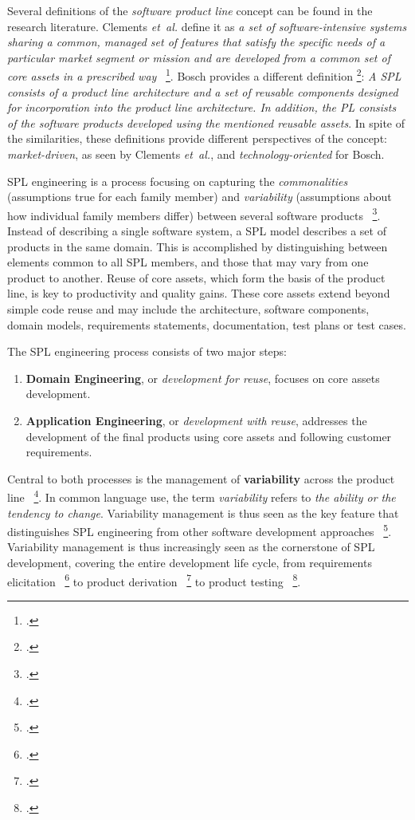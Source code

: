 Several definitions of the \emph{software product line} concept can be found
in the research literature. Clements \textit{et~al.} define it as \textit{a set of
software-intensive systems sharing a common, managed set of features that
satisfy the specific needs of a particular market segment or mission and are
developed from a common set of core assets in a prescribed way}~
   \footcite{Northrop2002}. Bosch provides a different definition    \footcite{Bosch2000}:
\textit{A SPL consists of a product line architecture and a set of reusable
components designed for incorporation into the product line architecture. In
addition, the PL consists of the software products developed using the
mentioned reusable assets}. In spite of the similarities, these definitions
provide different perspectives of the concept: \textit{market-driven}, as seen
by Clements \textit{et~al.}, and \textit{technology-oriented} for Bosch.

SPL engineering is a process focusing on capturing the \textit{commonalities}
(assumptions true for each family member) and \textit{variability}
(assumptions about how individual family members differ) between several
software products~ \footcite{Coplien1998}. Instead of describing a single software
system, a SPL model describes a set of products in the same domain. This is
accomplished by distinguishing between elements common to all SPL members, and
those that may vary from one product to another. Reuse of core assets, which
form the basis of the product line, is key to productivity and quality
gains. These core assets extend beyond simple code reuse and may include the
architecture, software components, domain models, requirements statements,
documentation, test plans or test cases.

The SPL engineering process consists of two major steps:
\begin{enumerate}
\item \textbf{Domain Engineering}, or \emph{development for reuse}, focuses on
core assets development.
\item \textbf{Application Engineering}, or \emph{development with reuse},
addresses the development of the final products using core assets and
following customer requirements.
\end{enumerate}

Central to both processes is the management of \textbf{variability} across
the product line~ \footcite{halmans2003}. In common language use, the term
\textit{variability} refers to \textit{the ability or the tendency to
change}. Variability management is thus seen as the key feature that
distinguishes SPL engineering from other software development approaches~ \footcite{Bosch2002}. Variability management is thus increasingly seen as the
cornerstone of SPL development, covering the entire development life cycle,
from requirements elicitation~ \footcite{Jean-ChristopheTRIGAUX2003} to product
derivation~ \footcite{Ziadi2006a} to product testing~ \footcite{nebut03b,Nebut06b}. 
 
